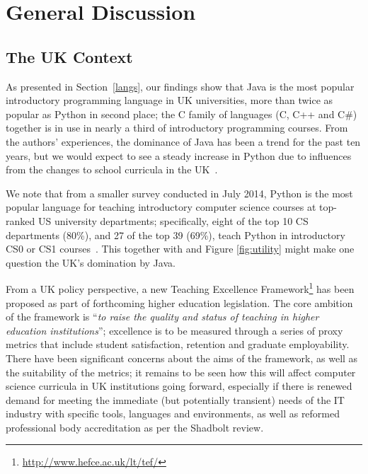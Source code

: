 \documentclass{sig-alternate}
\begin{document}
\section{General Discussion}\label{discussion}

\subsection{The UK Context}


As presented in Section~\ref{langs}, our findings show that Java is
the most popular introductory programming language in UK universities,
more than twice as popular as Python in second place; the C family of
languages (C, C++ and C\#) together is in use in nearly a third of
introductory programming courses. From the authors' experiences, the
dominance of Java has been a trend for the past ten years, but we
would expect to see a steady increase in Python due to influences from
the changes to school curricula in the UK~\cite{brown-et-al-toce2014}.

We note that from a smaller survey conducted in July 2014, Python is
the most popular language for teaching introductory computer science
courses at top-ranked US university departments; specifically, eight
of the top 10 CS departments (80\%), and 27 of the top 39 (69\%),
teach Python in introductory CS0 or CS1 courses~\cite{guo:2014}.
This together with \cite{mason+cooper:2014} and Figure \ref{fig:utility} might make one question the UK's domination by Java.

From a UK policy perspective, a new Teaching Excellence
Framework\footnote{\url{http://www.hefce.ac.uk/lt/tef/}} has been
proposed as part of forthcoming higher education legislation. The core
ambition of the framework is ``{\emph{to raise the quality and status
of teaching in higher education institutions}}''; excellence is to be
measured through a series of proxy metrics that include student
satisfaction, retention and graduate employability. There have been
significant concerns about the aims of the framework, as well as the
suitability of the metrics; it remains to be seen how this will affect
computer science curricula in UK institutions going forward,
especially if there is renewed demand for meeting the immediate (but
potentially transient) needs of the IT industry with specific tools,
languages and environments, as well as reformed professional body
accreditation as per the Shadbolt review.

\end{document}
